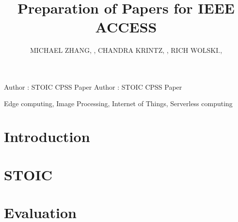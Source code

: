 \documentclass{ieeeaccess}
\begin{document}

\title{Preparation of Papers for IEEE ACCESS}
\author{\uppercase{Michael Zhang}, ,
\uppercase{Chandra Krintz}, , \uppercase{Rich Wolski}.,
}
\address[1]{Racelab, University of California, Santa Barbara, CA  93106-5110 U.S.A}


\markboth
{Author \headeretal: STOIC CPSS Paper}
{Author \headeretal: STOIC CPSS Paper}


\begin{abstract}
\label{sec:abstract}

\end{abstract}

\begin{keywords}
Edge computing, Image Processing, Internet of Things, Serverless computing
\end{keywords}

\titlepgskip=-15pt

\maketitle

\section{Introduction}
\label{sec:introduction}


\section{STOIC}
\label{sec:STOIC}



\section{Evaluation}
\label{sec:eval}

\end{document}
